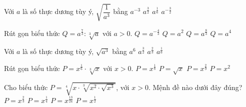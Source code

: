 \begin{ex}%
	Với $a$ là số thực  dương tùy ý, $\sqrt{\dfrac{1}{a^3}}$ bằng
	\choice 
		 {$a^{-3}$}
		 {$a^{\tfrac{3}{2}}$}
		{$a^{\tfrac{1}{6}}$} 
		 {\True $a^{-\tfrac{3}{2}}$}
\end{ex}

\begin{ex}%
	Rút gọn biểu thức  $Q=a^{\tfrac{7}{3}}:\sqrt[3]{a}$ với $a>0$.
	\choice 
		 {$Q=a^{-\tfrac{4}{3}}$}
		{\True $Q=a^2$} 
		{$Q=a^{\tfrac{8}{3}}$} 
		 {$Q=a^4$}
\end{ex}

\begin{ex}%
	[TK 2020-2021] Với $a$ là số thực dương tùy ý,  $\sqrt{a^3}$ bằng
	\choice 
		{$a^6$} 
		 {\True $a^{\frac{3}{2}}$}
		 {$a^{\frac{2}{3}}$}
		{$a^{\frac{1}{6}}$} 
\end{ex}

\begin{ex}%
	Rút gọn biểu  thức $P=x^{\tfrac{1}{6}}\cdot \sqrt[3]{x}$ với $x>0$.
	\choice 
		{$P=x^{\tfrac{1}{8}}$} 
		 {\True $P=\sqrt{x}$}
		{$P=x^{\tfrac{2}{9}}$} 
		 {$P=x^2$}
\end{ex}

\begin{ex}%
	Cho biểu thức $P = \sqrt[4]{x \cdot  \sqrt[3]{x^2 \cdot \sqrt{x^3}}}
	$, với $x>0$. Mệnh  đề nào dưới đây đúng?
	 \choice
		{$P=x^{\tfrac{2}{3}}$} 
		 {$P=x^{\tfrac{1}{4}}$}
		 {\True $P=x^{\tfrac{13}{24}}$}
		 {$P=x^{\tfrac{1}{2}}$}
\end{ex}

